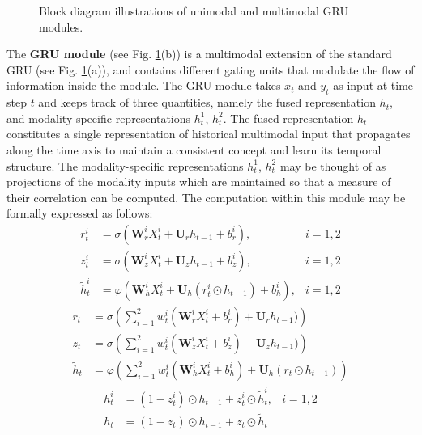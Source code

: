 \documentclass[10pt,twocolumn,letterpaper]{article}
\begin{document}
\begin{figure}
\begin{center}
	\begin{subfigure}[Unimodal GRU]{\texttt{[image: figure/GRU.pdf]}}
    \end{subfigure}
    \begin{subfigure}[Multimodal GRU]{\texttt{[image: figure/GRU2.pdf]}}
    \end{subfigure}
\end{center}
\caption{Block diagram illustrations of unimodal and multimodal GRU modules.}
\label{fig:GRU}
\end{figure}



The \textbf{GRU module} (see Fig. \ref{fig:GRU}(b)) is a multimodal extension of the standard GRU (see Fig. \ref{fig:GRU}(a)), and contains different gating units that modulate the flow of information inside the module. The GRU module takes $x_t$ and $y_t$ as input at time step $t$ and keeps track of three quantities, namely the fused representation $h_t$, and modality-specific representations $h_t^1$, $h_t^2$. The fused representation $h_t$ constitutes a single representation of historical multimodal input that propagates along the time axis to maintain a consistent concept and learn its temporal structure. The modality-specific representations $h_t^1$, $h_t^2$ may be thought of as projections of the modality inputs which are maintained so that a measure of their correlation can be computed. The computation within this module may be formally expressed as follows:
\begin{align}
r_t^i &=\sigma \left( \textbf{W}_r^i  X_t^i + \textbf{U}_r  h_{t-1} + b_r^i\right ),& i=1, 2 \\
z_t^i &=\sigma \left( \textbf{W}_z^i  X_t^i + \textbf{U}_z  h_{t-1} + b_z^i\right ),& i=1, 2 \\
\tilde{h}_t^i &= \varphi \left( \textbf{W}_h^i  X_t^i + \textbf{U}_h  (r_t^i \odot h_{t-1}) + b_h^i \right),&  i=1, 2
\end{align}
\begin{align}
r_t &=\sigma \left( \sum_{i=1}^2 w_t^i \left (\textbf{W}_r^i  X_t^i + b_r^i\right) + \textbf{U}_r  h_{t-1}) \right)\\
z_t &=\sigma \left( \sum_{i=1}^2 w_t^i \left (\textbf{W}_z^i  X_t^i + b_z^i\right) + \textbf{U}_z  h_{t-1}) \right)\\
\tilde{h}_t &= \varphi \left( \sum_{i=1}^2 w_t^i \left( \textbf{W}_h^i  X_t^i + b_h^i \right) + \textbf{U}_h  (r_t \odot h_{t-1}) \right)
\end{align}
\begin{align}
h_t^i &= (1 - z_t^i) \odot h_{t-1} +  z_t^i \odot \tilde{h}_t^i, & i=1,2\\
h_t &= (1 - z_t) \odot h_{t-1} + z_t \odot \tilde{h}_t
\end{align}
\end{document}
